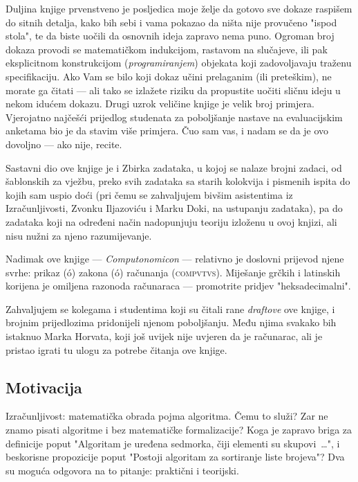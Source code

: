 Duljina knjige prvenstveno je posljedica moje želje da gotovo sve dokaze raspišem do sitnih detalja, kako bih sebi i vama pokazao da ništa nije provučeno "ispod stola", te da biste uočili da osnovnih ideja zapravo nema puno. Ogroman broj dokaza provodi se matematičkom indukcijom, rastavom na slučajeve, ili pak eksplicitnom konstrukcijom (\emph{programiranjem}) objekata koji zadovoljavaju traženu specifikaciju. Ako Vam se bilo koji dokaz učini prelaganim (ili preteškim), ne morate ga čitati --- ali tako se izlažete riziku da propustite uočiti sličnu ideju u nekom idućem dokazu. Drugi uzrok veličine knjige je velik broj primjera. Vjerojatno najčešći prijedlog studenata za poboljšanje nastave na evaluacijskim anketama bio je da stavim više primjera. Čuo sam vas, i nadam se da je ovo dovoljno --- ako nije, recite.

Sastavni dio ove knjige je i Zbirka zadataka, u kojoj se nalaze brojni zadaci, od šablonskih za vježbu, preko svih zadataka sa starih kolokvija i pismenih ispita do kojih sam uspio doći (pri čemu se zahvaljujem bivšim asistentima iz Izračunljivosti, Zvonku Iljazoviću i Marku Doki, na ustupanju zadataka), pa do zadataka koji na određeni način nadopunjuju teoriju izloženu u ovoj knjizi, ali nisu nužni za njeno razumijevanje.

Nadimak ove knjige --- \emph{Computonomicon} --- relativno je doslovni prijevod njene svrhe: prikaz ({\textgreekfont\textepsilon\textiota\textkappa\'o\textnu\textalpha}) zakona (\textnu\'o\textmugreek\textomikron\textvarsigma) računanja (\textsc{compvtvs}). Miješanje grčkih i latinskih korijena je omiljena razonoda računaraca --- promotrite pridjev "heksadecimalni".

Zahvaljujem se kolegama i studentima koji su čitali rane \emph{draftove} ove knjige, i brojnim prijedlozima pridonijeli njenom poboljšanju. Među njima svakako bih istaknuo Marka Horvata, koji još uvijek nije uvjeren da je računarac, ali je pristao igrati tu ulogu za potrebe čitanja ove knjige.

\subsection{Motivacija}

Izračunljivost: matematička obrada pojma algoritma. Čemu to služi? Zar ne znamo pisati algoritme i bez matematičke formalizacije? Koga je zapravo briga za definicije poput "Algoritam je uređena sedmorka, čiji elementi su skupovi~\ldots", i beskorisne propozicije poput "Postoji algoritam za sortiranje liste brojeva"? Dva su moguća odgovora na to pitanje: praktični i teorijski.


